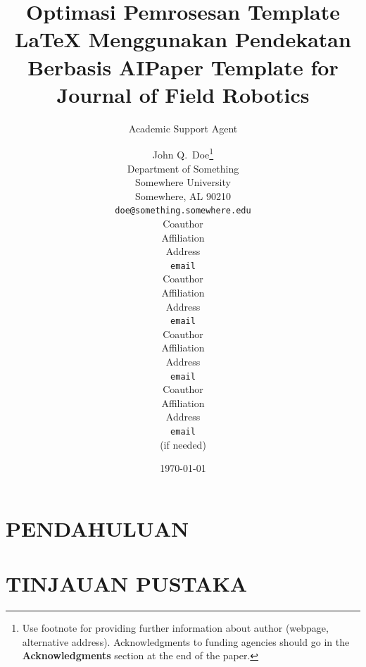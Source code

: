 \documentclass{article}
\title{Optimasi Pemrosesan Template LaTeX Menggunakan Pendekatan Berbasis AI}
\author{Academic Support Agent}
\date{\today}
\begin{document}
\maketitle

\begin{abstract}

\end{abstract}

\chapter{PENDAHULUAN}


\chapter{TINJAUAN PUSTAKA}


\usepackage{jfrExamplee}
\usepackage{graphicx}
\usepackage{apalike}
\usepackage{setspace}



\title{Paper Template for Journal of Field Robotics}

\author{
John Q.~Doe\thanks{ Use footnote for providing further information
about author (webpage, alternative address). Acknowledgments to
funding agencies should go in the \textbf{Acknowledgments} section
at the end of the paper.} \\
Department of Something\\
Somewhere University\\
Somewhere, AL 90210 \\
\texttt{doe@something.somewhere.edu} \\
\And
Coauthor \\
Affiliation \\
Address \\
\texttt{email} \\
\AND
Coauthor \\
Affiliation \\
Address \\
\texttt{email} \\
\And
Coauthor \\
Affiliation \\
Address \\
\texttt{email} \\
\And
Coauthor \\
Affiliation \\
Address \\
\texttt{email} \\
(if needed)\\
}
\end{document}

